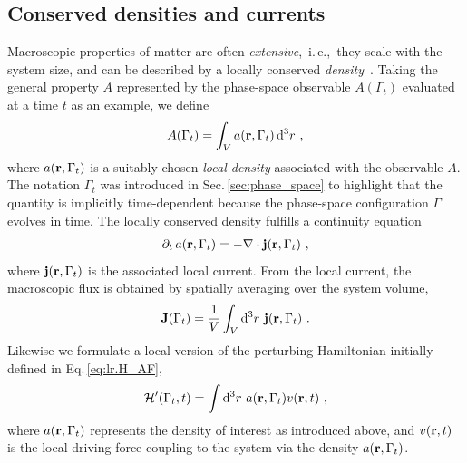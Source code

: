 \subsection{Conserved densities and currents}
Macroscopic properties of matter are often \emph{extensive},~i.\,e.,~they scale with the system size, and can be described by a locally conserved \emph{density}~\cite{Baroni2020a}. Taking the general property $A$ represented by the phase-space observable $A(\Gamma_t)$ evaluated at a time $t$ as an example, we define
\begin{align}
  A (\Gamma_t) = \int_V a (\b r, \Gamma_t) \, \d^3 r~,
  \label{eq:lr.A}
\end{align}
where $a({\bf r}, \Gamma_t)$ is a suitably chosen \emph{local density} associated with the observable $A$. The notation $\Gamma_t$ was introduced in Sec.\,\ref{sec:phase_space} to highlight that the quantity is implicitly time-dependent because the phase-space configuration $\Gamma$ evolves in time.
The locally conserved density fulfills a continuity equation
\begin{align}
  \partial_t \, a(\b r, \Gamma_t) = - \b \nabla \cdot \b j (\b r, \Gamma_t)~,
  \label{eq:lr.continuity.1}
\end{align}
where ${\bf j} ({\bf r}, \Gamma_t)$ is the associated local current. From the local current, the macroscopic flux is obtained by spatially averaging over the system volume,
\begin{align}
  \b J (\Gamma_t)
    = \frac{1}{V} \int_V \d^3 r ~ \b j (\b r, \Gamma_t)~.
  \label{eq:lr.J(t)}
\end{align}
Likewise we formulate a local version of the perturbing Hamiltonian initially defined in Eq.\,\eqref{eq:lr.H_AF},
\begin{align}
	\mathcal H' (\Gamma_t, t) = \int \d^3 r ~ a (\b r, \Gamma_t) v(\b r, t)~,
	\label{eq:lr.H'}
\end{align}
where $a({\bf r}, \Gamma_t)$ represents the density of interest as introduced above, and $v({\bf r}, t)$ is the local driving force coupling to the system via the density $a ({\bf r}, \Gamma_t)$.

